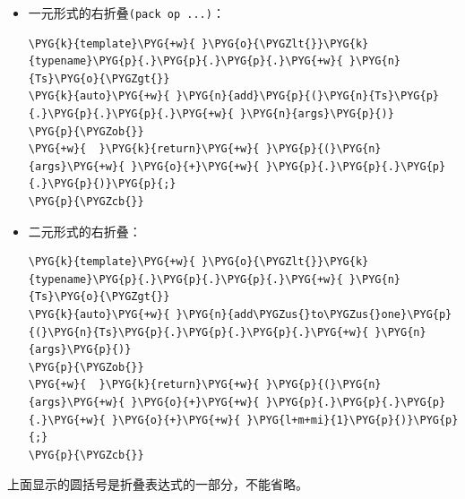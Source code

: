 \begin{itemize}

\item 一元形式的右折叠\texttt{(\allowbreak{}pack op ...)}：



\begin{codeblockbg}
\begin{Verbatim}[commandchars=\\\{\},breaklines=true,breakanywhere=true,fontsize=\codefont,xleftmargin=17bp]
\PYG{k}{template}\PYG{+w}{ }\PYG{o}{\PYGZlt{}}\PYG{k}{typename}\PYG{p}{.}\PYG{p}{.}\PYG{p}{.}\PYG{+w}{ }\PYG{n}{Ts}\PYG{o}{\PYGZgt{}}
\PYG{k}{auto}\PYG{+w}{ }\PYG{n}{add}\PYG{p}{(}\PYG{n}{Ts}\PYG{p}{.}\PYG{p}{.}\PYG{p}{.}\PYG{+w}{ }\PYG{n}{args}\PYG{p}{)}
\PYG{p}{\PYGZob{}}
\PYG{+w}{  }\PYG{k}{return}\PYG{+w}{ }\PYG{p}{(}\PYG{n}{args}\PYG{+w}{ }\PYG{o}{+}\PYG{+w}{ }\PYG{p}{.}\PYG{p}{.}\PYG{p}{.}\PYG{p}{)}\PYG{p}{;}
\PYG{p}{\PYGZcb{}}
\end{Verbatim}
\end{codeblockbg}



\item 二元形式的右折叠：



\begin{codeblockbg}
\begin{Verbatim}[commandchars=\\\{\},breaklines=true,breakanywhere=true,fontsize=\codefont,xleftmargin=17bp]
\PYG{k}{template}\PYG{+w}{ }\PYG{o}{\PYGZlt{}}\PYG{k}{typename}\PYG{p}{.}\PYG{p}{.}\PYG{p}{.}\PYG{+w}{ }\PYG{n}{Ts}\PYG{o}{\PYGZgt{}}
\PYG{k}{auto}\PYG{+w}{ }\PYG{n}{add\PYGZus{}to\PYGZus{}one}\PYG{p}{(}\PYG{n}{Ts}\PYG{p}{.}\PYG{p}{.}\PYG{p}{.}\PYG{+w}{ }\PYG{n}{args}\PYG{p}{)}
\PYG{p}{\PYGZob{}}
\PYG{+w}{  }\PYG{k}{return}\PYG{+w}{ }\PYG{p}{(}\PYG{n}{args}\PYG{+w}{ }\PYG{o}{+}\PYG{+w}{ }\PYG{p}{.}\PYG{p}{.}\PYG{p}{.}\PYG{+w}{ }\PYG{o}{+}\PYG{+w}{ }\PYG{l+m+mi}{1}\PYG{p}{)}\PYG{p}{;}
\PYG{p}{\PYGZcb{}}
\end{Verbatim}
\end{codeblockbg}


\end{itemize}



\begin{myNote}
上面显示的圆括号是折叠表达式的一部分，不能省略。
\end{myNote}



